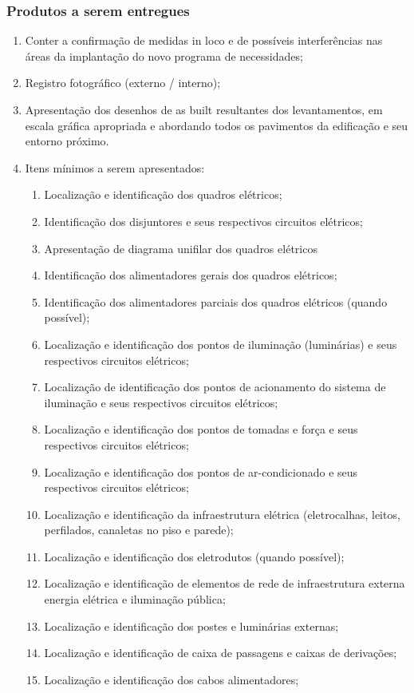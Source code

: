 \subsubsection{Produtos a serem entregues}
\begin{enumerate}
	
	\item	Conter a confirmação de medidas in loco e de possíveis interferências nas áreas da implantação do novo programa de necessidades;
	
	\item	Registro fotográfico (externo / interno);
	
	\item	Apresentação dos desenhos de as built resultantes dos levantamentos, em escala gráfica apropriada e abordando todos os pavimentos da edificação e seu entorno próximo.
	
	\item Itens mínimos a serem apresentados:
	\begin{enumerate}
		
		\item	Localização e identificação dos quadros elétricos;
		\item	Identificação dos disjuntores e seus respectivos circuitos elétricos;
		\item	Apresentação de diagrama unifilar dos quadros elétricos
		\item	Identificação dos alimentadores gerais dos quadros elétricos;
		\item	Identificação dos alimentadores parciais dos quadros elétricos (quando possível);
		\item	Localização e identificação dos pontos de iluminação (luminárias) e seus respectivos circuitos elétricos;
		\item	Localização de identificação dos pontos de acionamento do sistema de iluminação e seus respectivos circuitos elétricos;
		\item	Localização e identificação dos pontos de tomadas e força e seus respectivos circuitos elétricos;
		\item	Localização e identificação dos pontos de ar-condicionado e seus respectivos circuitos elétricos;
		\item	Localização e identificação da infraestrutura elétrica (eletrocalhas, leitos, perfilados, canaletas no piso e parede);
		\item	Localização e identificação dos eletrodutos (quando possível);
		\item	Localização e identificação de elementos de rede de infraestrutura externa energia elétrica e iluminação pública;
		\item	Localização e identificação dos postes e luminárias externas;
		\item	Localização e identificação de caixa de passagens e caixas de derivações;
		\item	Localização e identificação dos cabos alimentadores; 
		
		
	\end{enumerate}
	
\end{enumerate}